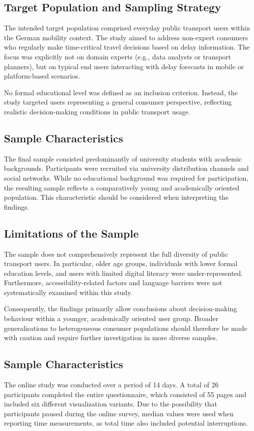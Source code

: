\documentclass[final,journal,a4paper]{IEEEtran}
\begin{document}
\subsection{Target Population and Sampling Strategy}
The intended target population comprised everyday public transport users within the German mobility context. The study aimed to address non-expert consumers who regularly make time-critical travel decisions based on delay information. The focus was explicitly not on domain experts (e.g., data analysts or transport planners), but on typical end users interacting with delay forecasts in mobile or platform-based scenarios.

No formal educational level was defined as an inclusion criterion. Instead, the study targeted users representing a general consumer perspective, reflecting realistic decision-making conditions in public transport usage.

\subsection{Sample Characteristics}
The final sample consisted predominantly of university students with academic backgrounds. Participants were recruited via university distribution channels and social networks. While no educational background was required for participation, the resulting sample reflects a comparatively young and academically oriented population. This characteristic should be considered when interpreting the findings.

\subsection{Limitations of the Sample}
The sample does not comprehensively represent the full diversity of public transport users. In particular, older age groups, individuals with lower formal education levels, and users with limited digital literacy were under-represented. Furthermore, accessibility-related factors and language barriers were not systematically examined within this study.

Consequently, the findings primarily allow conclusions about decision-making behaviour within a younger, academically oriented user group. Broader generalisations to heterogeneous consumer populations should therefore be made with caution and require further investigation in more diverse samples.

\subsection{Sample Characteristics}
The online study was conducted over a period of 14 days. A total of 26 participants completed the entire questionnaire, which consisted of 55 pages and included six different visualization variants. Due to the possibility that participants paused during the online survey, median values were used when reporting time measurements, as total time also included potential interruptions.
\end{document}
